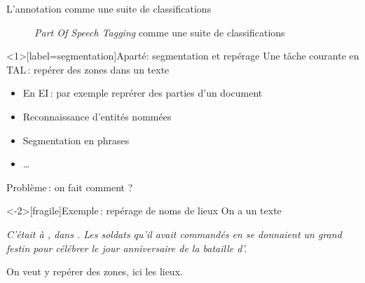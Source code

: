 \documentclass[xcolor={svgnames}, french]{beamer}
\begin{document}
\begin{frame}[fragile]{L'annotation comme une suite de classifications}
	\begin{figure}
		\tikzset{external/export=true}
		\caption{\emph{Part Of Speech Tagging} comme une suite de classifications}
	\end{figure}
\end{frame}

\begin{frame}<1>[label=segmentation]{Aparté: segmentation et repérage}
	Une tâche courante en TAL : repérer des zones dans un texte
	\begin{itemize}
		\item En EI : par exemple reprérer des parties d'un document
		\item Reconnaissance d'entités nommées
		\item Segmentation en phrases
		\item …
	\end{itemize}

	\pause

	Problème : on fait comment ?
\end{frame}

\begin{frame}<-2>[fragile]{Exemple : repérage de noms de lieux}
	On a un texte

	\vspace{\bigskipamount}
	{\itshape
		C’était à , dans . Les soldats qu’il avait commandés en  se donnaient un grand festin pour célébrer le jour anniversaire de la bataille d’\hightlightikz<2->{Éryx}.
	}
	\vspace{\bigskipamount}

	\pause

	On veut y repérer des zones, ici les \alert{lieux}.
\end{frame}
\end{document}
